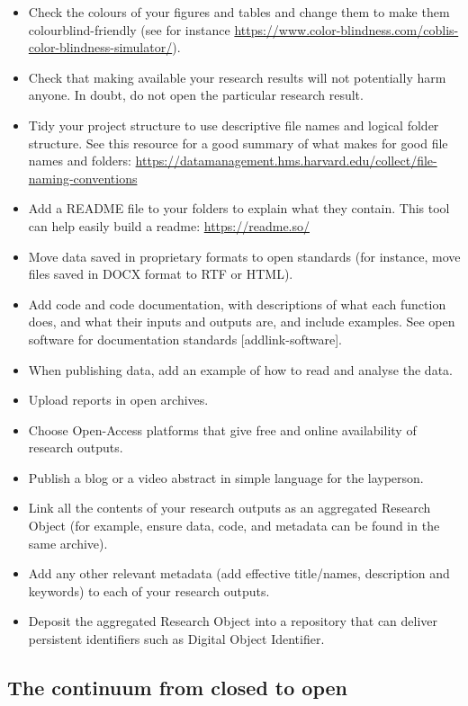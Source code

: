\documentclass[
  letterpaper,
  DIV=11,
  numbers=noendperiod]{scrreport}
\providecommand{\tightlist}{%
  \setlength{\itemsep}{0pt}\setlength{\parskip}{0pt}}\usepackage{longtable,booktabs,array}
\begin{document}
\begin{itemize}
\tightlist
\item
  Check the colours of your figures and tables and change them to make
  them colourblind-friendly (see for instance
  \url{https://www.color-blindness.com/coblis-color-blindness-simulator/}).
\item
  Check that making available your research results will not potentially
  harm anyone. In doubt, do not open the particular research result.
\item
  Tidy your project structure to use descriptive file names and logical
  folder structure. See this resource for a good summary of what makes
  for good file names and folders:
  \url{https://datamanagement.hms.harvard.edu/collect/file-naming-conventions}
\item
  Add a README file to your folders to explain what they contain. This
  tool can help easily build a readme: \url{https://readme.so/}
\item
  Move data saved in proprietary formats to open standards (for
  instance, move files saved in DOCX format to RTF or HTML).
\item
  Add code and code documentation, with descriptions of what each
  function does, and what their inputs and outputs are, and include
  examples. See open software for documentation standards
  {[}addlink-software{]}.
\item
  When publishing data, add an example of how to read and analyse the
  data.
\item
  Upload reports in open archives.
\item
  Choose Open-Access platforms that give free and online availability of
  research outputs.
\item
  Publish a blog or a video abstract in simple language for the
  layperson.
\item
  Link all the contents of your research outputs as an aggregated
  Research Object (for example, ensure data, code, and metadata can be
  found in the same archive).
\item
  Add any other relevant metadata (add effective title/names,
  description and keywords) to each of your research outputs.
\item
  Deposit the aggregated Research Object into a repository that can
  deliver persistent identifiers such as Digital Object Identifier.
\end{itemize}

\hypertarget{the-continuum-from-closed-to-open}{%
\subsection{The continuum from closed to
open}\label{the-continuum-from-closed-to-open}}
\end{document}
